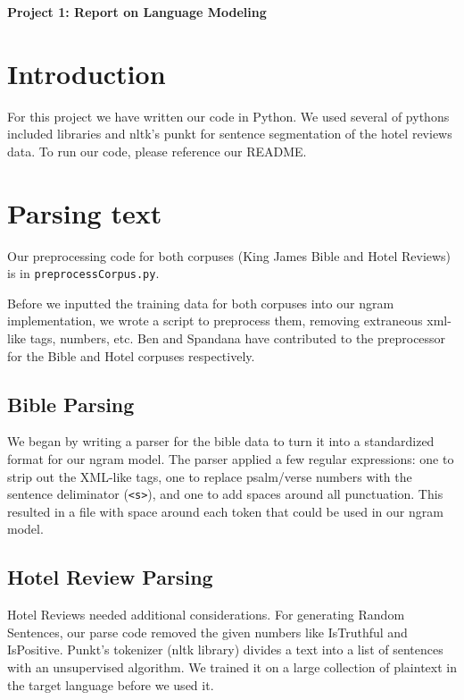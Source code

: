 \documentclass{article}
\begin{document}
\begin{center}\textbf{Project 1: Report on Language Modeling}\end{center}

\section*{Introduction}

For this project we have written our code in Python. We used several of pythons included libraries and nltk's punkt for sentence segmentation of the hotel reviews data. To run our code, please reference our README.

\section{Parsing text}
Our preprocessing code for both corpuses (King James Bible and Hotel Reviews) is in \texttt{preprocessCorpus.py}.\par

Before we inputted the training data for both corpuses into our ngram implementation, we wrote a script to preprocess them, removing extraneous xml-like tags, numbers, etc. Ben and Spandana have contributed to the preprocessor for the Bible and Hotel corpuses respectively.\par

\subsection{Bible Parsing}

We began by writing a parser for the bible data to turn it into a standardized format for our ngram model. The parser applied a few regular expressions: one to strip out the XML-like tags, one to replace psalm/verse numbers with the sentence deliminator (\texttt{<s>}), and one to add spaces around all punctuation. This resulted in a file with space around each token that could be used in our ngram model. 

\subsection{Hotel Review Parsing}

Hotel Reviews needed additional considerations. For generating Random Sentences, our parse code removed the given numbers like IsTruthful and IsPositive. Punkt's tokenizer (nltk library) divides a text into a list of sentences with an unsupervised algorithm. We trained it on a large collection of plaintext in the target language before we used it.
\end{document}
